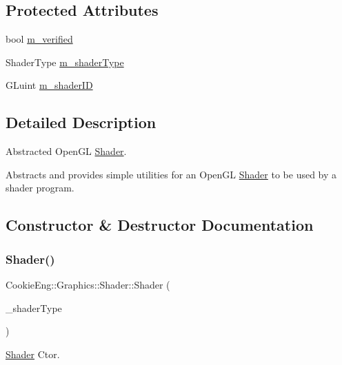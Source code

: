 \subsection*{Protected Attributes}
\begin{DoxyCompactItemize}
\item 
bool \hyperlink{class_cookie_eng_1_1_graphics_1_1_shader_acfa364395f90fdea34e5365221b3b564}{m\+\_\+verified}
\item 
Shader\+Type \hyperlink{class_cookie_eng_1_1_graphics_1_1_shader_a50b512033ec7bd695dcd4daa2d971c22}{m\+\_\+shader\+Type}
\item 
G\+Luint \hyperlink{class_cookie_eng_1_1_graphics_1_1_shader_a3c2b2bf0f97b9367c3871de99378bbbf}{m\+\_\+shader\+ID}
\end{DoxyCompactItemize}


\subsection{Detailed Description}
Abstracted Open\+GL \hyperlink{class_cookie_eng_1_1_graphics_1_1_shader}{Shader}. 

Abstracts and provides simple utilities for an Open\+GL \hyperlink{class_cookie_eng_1_1_graphics_1_1_shader}{Shader} to be used by a shader program. 

\subsection{Constructor \& Destructor Documentation}
\mbox{\label{class_cookie_eng_1_1_graphics_1_1_shader_a98dc593bccbf90a50cadf035b3382374}} 
\subsubsection{\texorpdfstring{Shader()}{Shader()}}
{\footnotesize\ttfamily Cookie\+Eng\+::\+Graphics\+::\+Shader\+::\+Shader (\begin{DoxyParamCaption}\item[{Shader\+Type}]{\+\_\+shader\+Type }\end{DoxyParamCaption})}



\hyperlink{class_cookie_eng_1_1_graphics_1_1_shader}{Shader} Ctor. 


